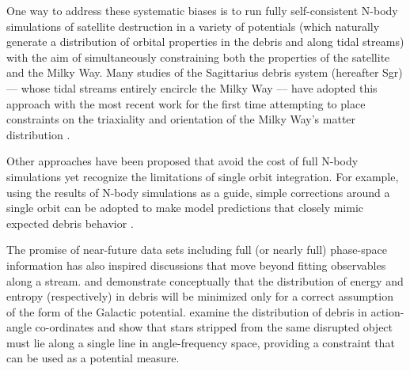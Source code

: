 \documentclass{emulateapj}
\begin{document}
One way to address these systematic biases is to run fully self-consistent N-body simulations of satellite destruction in a variety of potentials (which naturally generate a
distribution of orbital properties in the debris and along tidal streams) with the aim of simultaneously constraining both the properties of the satellite and the Milky Way.
Many studies of the Sagittarius debris system (hereafter Sgr) --- whose tidal streams entirely encircle the Milky Way --- have adopted this approach 
with the most recent work for the first time attempting to place constraints on the triaxiality and orientation of the Milky Way's matter distribution
\citep{law10}.

Other approaches have been proposed that avoid the cost of full N-body simulations yet recognize the limitations of single orbit integration.
For example, using the results of N-body simulations as a guide, simple corrections around a single orbit can be adopted to make model predictions that closely
mimic expected debris behavior \citep[e.g.][]{johnston99b,varghese11}.

The promise of near-future data sets including full (or nearly full) phase-space information has also inspired discussions that move beyond fitting observables along a
stream.
\citet{binney08} and \citet{penarrubia12} demonstrate conceptually that the distribution of energy and entropy (respectively) in debris will be minimized only for a correct
assumption of the form of the Galactic potential.
\citet{sanders13b} examine the distribution of debris in action-angle co-ordinates and show that stars stripped from the same disrupted object must lie along a single line in angle-frequency space, providing a constraint that can be used as a potential measure.
\end{document}
